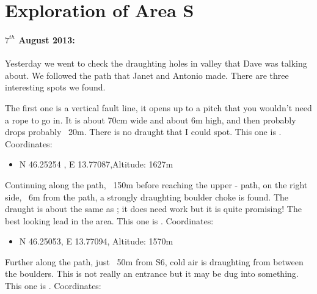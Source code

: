 \section{ Exploration of Area S}

\begin{marginfigure}
\end{marginfigure}
\paragraph{$7^{th}$ August 2013: } Yesterday we went to check the draughting holes in  valley that Dave was talking about. We followed the path that Janet and Antonio made. There are three interesting spots we found.

The first one is a vertical fault line, it opens up to a pitch that you wouldn't need a rope to go in. It is about 70cm wide and about 6m high, and then probably drops probably ~20m. There is no draught that I could spot.
This one is . Coordinates:

\begin{itemize}
	\item N 46.25254 , E 13.77087,Altitude: 1627m
\end{itemize}


Continuing along the path, ~150m before reaching the upper - path, on the right side, ~6m from the path, a strongly draughting boulder choke is found. The draught is about the same as ; it does need work but it is quite promising! The best looking lead in the area.
This one is . Coordinates:

\begin{itemize}
	\item N 46.25053, E 13.77094, Altitude: 1570m
\end{itemize}

Further along the path, just ~50m from S6, cold air is draughting from between the boulders. This is not really an entrance but it may be dug into something. This one is . Coordinates:

